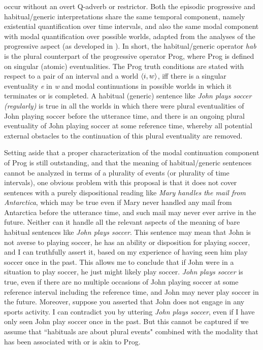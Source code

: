 \documentclass[output=paper,colorlinks,citecolor=brown]{langscibook}
\begin{document}
occur without an overt Q-adverb or restrictor.
Both the episodic progressive and habitual/generic interpretations share the same temporal component, namely existential quantification over time intervals, and also the same modal component with modal quantification over possible worlds,
adapted from the analyses of the progressive aspect (as developed in \citealt{Dowty1979,Landman92,portner1998progressive}). In short,
the habitual/generic  operator \textit{hab} is the plural counterpart of the progressive operator
Prog, where Prog is defined on singular (atomic) eventualities.
The Prog truth conditions
are stated with respect to a pair of an interval and a world $\langle{i,w}\rangle$,
iff there is a singular eventuality \textit{e} in \textit{w} and modal continuations in possible worlds in which it terminates or is completed.
A habitual (generic) sentence like \textit{John plays soccer (regularly)} is true in all the worlds in which there were plural eventualities of John playing soccer before the utterance time, and there is an ongoing plural eventuality of John playing soccer at some reference time, whereby all potential external obstacles to the continuation of this plural eventuality are removed.

Setting aside that a proper characterization of the modal continuation component of Prog is still outstanding, and that the meaning of habitual/generic sentences cannot be analyzed in terms of a plurality of events (or plurality of time intervals), one obvious problem with this proposal is that it does not cover sentences with a purely dispositional reading like
\textit{Mary handles the mail from Antarctica},
which may be true even if Mary never handled any mail from Antarctica before the utterance time, and such mail may never ever arrive in the future. Neither can it handle all the relevant aspects of the meaning of bare habitual sentences like \textit{John plays soccer}.
This sentence may mean that John is not averse to playing soccer, he has an ability or disposition for playing soccer, and I can truthfully assert it,
based on my experience of having seen him play soccer once in the past.
This allows me to conclude that if John were in a situation to play soccer, he just might likely play soccer. \textit{John plays soccer} is true, even if there are no multiple occasions of John playing soccer at some reference interval including the reference time,
and John may never play soccer in the future.
Moreover, suppose you asserted that John does not engage in any sports activity. I can contradict you by uttering \textit{John plays soccer},
even if I have only seen John play soccer once in the past.
But this cannot be captured if we assume that ``habituals are about plural events" \citep[353]{ferreira2016} combined with the modality that has been associated with or is akin to Prog.
\end{document}
